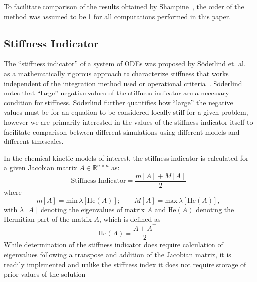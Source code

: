 \documentclass[12pt]{ussci}
\begin{document}
To facilitate comparison of the results obtained by Shampine~\cite{Shampine1985}, the order of the method was assumed to be 1 for all computations performed in this paper.

\subsection{Stiffness Indicator}
The ``stiffness indicator'' of a system of ODEs was proposed by S{\"o}derlind et. al. as a mathematically rigorous approach to characterize stiffness that works independent of the integration method used or operational criteria~\cite{Soderlind2014}.
S{\"o}derlind notes that ``large'' negative values of the stiffness indicator are a necessary condition for stiffness.  
S{\"o}derlind further quantifies how ``large'' the negative values must be for an equation to be considered locally stiff for a given problem, however we are primarily interested in the values of the stiffness indicator itself to facilitate comparison between different simulations using different models and different timescales.

In the chemical kinetic models of interest, the stiffness indicator is calculated for a given Jacobian matrix $A \in \mathbb{R}^{n \times n}$ as:
\begin{equation}
	\textrm{Stiffness Indicator} = \frac{m[A] + M[A]}{2}
\end{equation}
where
\begin{equation}
	m[A] = \textrm{min}\,\lambda[\textrm{He}(A)];\qquad M[A] = \textrm{max}\,\lambda[\textrm{He}(A)],
\end{equation}
with $\lambda [A]$ denoting the eigenvalues of matrix $A$ and $\textrm{He}(A)$ denoting the Hermitian part of the matrix $A$, which is defined as
\begin{equation}
	\textrm{He}(A) = \frac{A + A^\intercal}{2}.
\end{equation}
While determination of the stiffness indicator does require calculation of eigenvalues following a transpose and addition of the Jacobian matrix, it is readily implemented and unlike the stiffness index it does not require storage of prior values of the solution.
\end{document}
